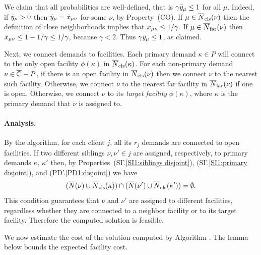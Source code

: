 \documentclass[oneside,final]{ucr}
\begin{document}
We claim that all probabilities are well-defined, that is
$\gamma{\bar y}_{\mu} \le 1$ for all $\mu$. Indeed, if ${\bar y}_{\mu}>0$ then
${\bar y}_{\mu} = {\bar x}_{\mu\nu}$ for some $\nu$, by Property~(CO).
If $\mu\in {\overline{N}}_{{\mbox{\scriptsize\rm cls}}}(\nu)$ then the definition of close
neighborhoods implies that ${\bar x}_{\mu\nu} \le 1/\gamma$.
If $\mu\in {\overline{N}}_{{\mbox{\scriptsize\rm far}}}(\nu)$ then
${\bar x}_{\mu\nu} \le 1-1/\gamma \le 1/\gamma$, because $\gamma < 2$.
Thus $\gamma{\bar y}_{\mu} \le 1$, as claimed.

Next, we connect demands to facilities.  Each primary demand
$\kappa\in P$ will connect to the only open facility $\phi(\kappa)$ in
${\overline{N}}_{{\mbox{\scriptsize\rm cls}}}(\kappa)$.  For each non-primary demand $\nu\in \overline{\mathbb{C}}
- P$, if there is an open facility in ${\overline{N}}_{{\mbox{\scriptsize\rm cls}}}(\nu)$ then we
connect $\nu$ to the nearest such facility. Otherwise, we connect
$\nu$ to the nearest far facility in ${\overline{N}}_{{\mbox{\scriptsize\rm far}}}(\nu)$ if one is
open. Otherwise, we connect $\nu$ to its \emph{target facility}
$\phi(\kappa)$, where $\kappa$ is the primary demand that $\nu$ is
assigned to.


\paragraph{Analysis.}
By the algorithm, for each client $j$, all its $r_j$ demands are connected to
open facilities. If two different siblings $\nu,\nu'\in j$ are assigned, respectively,
to primary demands $\kappa$, $\kappa'$ then, by
Properties~(SI'.\ref{SI1:siblings disjoint}), (SI'.\ref{SI1:primary
  disjoint}), and (PD'.\ref{PD1:disjoint}) we have
%
\begin{equation*}
( {\overline{N}}(\nu) \cup {\overline{N}}_{{\mbox{\scriptsize\rm cls}}}(\kappa)) \cap ({\overline{N}}(\nu')\cup {\overline{N}}_{{\mbox{\scriptsize\rm cls}}}(\kappa')) = \emptyset.
\end{equation*}
%
This condition guarantees that $\nu$ and $\nu'$ are assigned to different facilities,
regardless whether they are connected to a neighbor facility or to its target facility.
Therefore the computed solution is feasible.

\medskip

We now estimate the cost of the solution computed by Algorithm {\EBGS}. The lemma
below bounds the expected facility cost.

\end{document}
